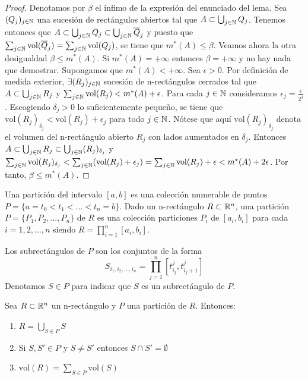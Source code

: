 \begin{proof}
    Denotamos por $\beta$ el ínfimo de la expresión del enunciado del lema. Sea $(Q_j)_{j \in \mathbb{N}}$ una sucesión de rectángulos abiertos tal que $A \subset \bigcup_{j \in \mathbb{N}} Q_j$. Tenemos entonces que $A \subset \bigcup_{j \in \mathbb{N}} Q_j \subset \bigcup_{j \in \mathbb{N}} \overline{Q}_j$ y puesto que $\sum_{j \in \mathbb{N}} \text{vol}(\overline{Q}_j) = \sum_{j \in \mathbb{N}} \text{vol}(Q_j)$, se tiene que $m^*(A) \leq \beta$. Veamos ahora la otra desigualdad $\beta \leq m^*(A)$. Si $m^*(A) = +\infty$ entonces $\beta = +\infty$ y no hay nada que demostrar. Supongamos que $m^*(A) < +\infty$. Sea $\epsilon > 0$. Por definición de medida exterior, $\exists (R_j)_{j \in \mathbb{N}}$ sucesión de n-rectángulos cerrados tal que $A \subset \bigcup_{j \in \mathbb{N}} R_j$ y $\sum_{j \in \mathbb{N}} \text{vol}(R_j) < m^*(A) + \epsilon$. Para cada $j \in \mathbb{N}$ consideramos $\epsilon_j = \frac{\epsilon}{2^j}$. Escogiendo $\delta_j > 0$ lo suficientemente pequeño, se tiene que $\text{vol}(R_j)_{\delta_j} < \text{vol}(R_j) + \epsilon_j$ para todo $j \in \mathbb{N}$. Nótese que aquí $\text{vol}(R_j)_{\delta_j}$ denota el volumen del n-rectángulo abierto $R_j$ con lados aumentados en $\delta_j$. Entonces $A \subset \bigcup_{j \in \mathbb{N}} R_j \subset \bigcup_{j \in \mathbb{N}} (R_j)_{\delta_j}$ y $\sum_{j \in \mathbb{N}} \text{vol}(R_j)_{\delta_j} < \sum_{j \in \mathbb{N}} (\text{vol}(R_j) + \epsilon_j) = \sum_{j \in \mathbb{N}} \text{vol}(R_j) + \epsilon < m^*(A) + 2\epsilon$. Por tanto, $\beta \leq m^*(A)$.
\end{proof}

\begin{definición}
Una partición del intervalo $[a,b]$ es una colección numerable de puntos $P = \{a = t_0 < t_1 < ... < t_n = b\}$. Dado un n-rectángulo $R \subset \mathbb{R}^n$, una partición $P =  \{P_1, P_2, ..., P_n\}$ de $R$ es una colección particiones $P_i$ de $[a_i, b_i]$ para cada $i = 1, 2, ..., n$ siendo $R = \prod_{i=1}^n [a_i, b_i]$.
\end{definición}

Los subrectángulos de $P$ son los conjuntos de la forma
\begin{equation}
    S_{i_1, i_2, ..., i_n} = \prod_{j=1}^n [t_{i_j}^j, t_{i_j + 1}^j]
\end{equation}
Denotamos $S \in P$ para indicar que $S$ es un subrectángulo de $P$.

\begin{lema}
    Sea $R \subset \mathbb{R}^n$ un n-rectángulo y $P$ una partición de $R$. Entonces:
    \vspace{-0.5em}
    \begin{enumerate}
        \item $R = \bigcup_{S \in P} S$
        \item Si $S, S' \in P$ y $S \neq S'$ entonces $S \cap S' = \emptyset$
        \item $\text{vol}(R) = \sum_{S \in P} \text{vol}(S)$
    \end{enumerate}
\end{lema}

